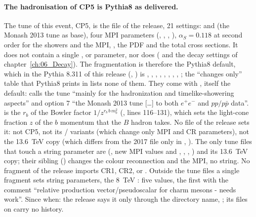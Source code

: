 \paragraph{The hadronisation of CP5 is Pythia8 as delivered.}
The tune of this event, CP5, is the file  of
the release, 21 settings:  and  (the Monash 2013 tune as base), four MPI parameters
(, , , ), $\alpha_S=0.118$ at second order
for the showers and the MPI, , the PDF  and the
total cross sections. It does not contain a single ,  or  parameter, nor
does  ( and the decay settings of
chapter~\ref{ch:06_Decay}). The fragmentation is therefore the Pythia8 default, which in the Pythia 8.311 of this
release (, ) is ,
, , , , , , , ; the ``changes
only'' table that Pythia8 prints in  lists none of them. They come with \mbox{}, itself the default:  calls  the tune ``mainly for the hadronization and
timelike-showering aspects'' and option 7 ``the Monash 2013 tune [\ldots] to both $e^+e^-$ and $pp/p\bar p$ data''.
 is the $r_b$ of the Bowler factor $1/z^{r_b\,b\,m_b^2}$ (, lines 116--131),
which sets the light-cone fraction $z$ of the $b$ momentum that the $B$ hadron takes. No file of the release sets it:
not CP5, not its / variants (which change only MPI and CR parameters), not the 13.6~TeV
copy  (which differs from the 2017 file only in
, ). The only tune files that touch a string parameter are
 (, new MPI values and
, , , ) and its 13.6~TeV copy;
their sibling  () changes the colour reconnection and the MPI, no string. No fragment of the
release imports CR1, CR2,  or . Outside the tune files a single fragment sets string
parameters, the 8~TeV : five  values, the first
 with the comment ``relative production vector/pseudoscalar for charm mesons - needs
work''. Since when: the release says it only through the directory name, ; its files on 
carry no history.

